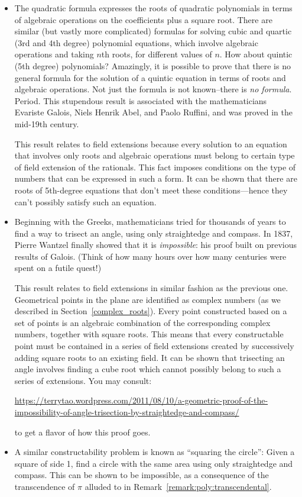 \begin{itemize}
\item 
The quadratic formula expresses the roots of quadratic polynomials  in terms of algebraic operations on the coefficients plus a square root. There are similar (but vastly more complicated) formulas for solving cubic and quartic (3rd and 4th degree)  polynomial equations, which involve algebraic operations and  taking $n$th roots, for different values of $n$.  How about quintic (5th degree) polynomials?  Amazingly, it is possible to prove that there is no general formula for the solution of a quintic equation in terms of roots and algebraic operations.  Not just the formula is not known--there is \emph{no formula}. Period. This stupendous result is associated with the mathematicians Evariste Galois, Niels Henrik Abel, and Paolo Ruffini, and was proved in the mid-19th century.

This result relates to field extensions because every solution to an equation that involves only roots and algebraic operations must belong to certain type of field extension of the rationals. This fact imposes conditions on the type of numbers that can be expressed in such a form. It can be shown that there are roots of 5th-degree equations that don't meet these conditions---hence they can't possibly satisfy such an equation.

\item
Beginning with the Greeks,  mathematicians tried for thousands of years to find a way to trisect an angle, using only straightedge and compass. In 1837, Pierre Wantzel finally showed that it is \emph{impossible}: his proof built on previous results of Galois. (Think of how many hours over how many centuries were spent on a futile quest!)

This result relates to field extensions in similar fashion as the previous one. Geometrical points in the plane are identified as complex numbers (as we described in Section~\ref{complex_roots}). Every point constructed based on a set of  points is an algebraic combination of the corresponding complex numbers, together with square roots. This means that every constructable point must be contained in a series of field extensions created by successively adding square roots to an existing field. It can be shown that trisecting an angle involves finding a cube root which cannot possibly belong to such a series of extensions.  You may consult:

\noindent
 \url{https://terrytao.wordpress.com/2011/08/10/a-geometric-proof-of-the-impossibility-of-angle-trisection-by-straightedge-and-compass/}

\noindent
 to get a flavor of how this proof goes.
\item
A similar constructability problem is known as ``squaring the circle'':  Given a square of side 1, find a circle with the same area using only straightedge and compass. This can be shown to be impossible, as a consequence of the transcendence of $\pi$ alluded to in Remark~\ref{remark:poly:transcendental}.
\end{itemize}


